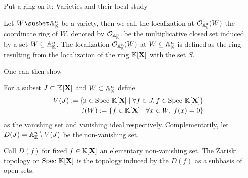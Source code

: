 \begin{subsection}{Put a ring on it: Varieties and their local study}
    \begin{definition}
        Let \( W \susbet \stdaff \) be a variety, then we call the localization at \( \mathcal{O}_{\mathbb{A}^{n}_{\mathbb{K}}}(W) \) the coordinate ring of \( W \), denoted by \( \mathcal{O}_{\mathbb{A}^{n}_{\mathbb{K}}} \).
        be the multiplicative closed set induced by a set \( W \subseteq \mathbb{A}^{n}_{\mathbb{K}} \).
        The localization \( \mathcal{O}_{\mathbb{A}^{n}_{\mathbb{K}}}(W) \) at \( W \subseteq \mathbb{A}^{n}_{\mathbb{K}} \) is defined as the ring resulting from the localization of the ring \( \mathbb{K}[\mathbf{X}] \) 
        with the set \( S \). 
    \end{definition}
    

    \begin{theorem}

    \end{theorem}
    One can then show 
    \begin{definition}
        For a subset \( J \subset \mathbb{K}[\mathbf{X}] \) and \( W \subset \mathbb{A}^{n}_{\mathbb{K}} \) define
        \begin{align*}
            V(J) := \left\{ \mathfrak{p} \in \text{Spec } \mathbb{K}[\mathbf{X}] \mid \forall f \in J, f \in \text{Spec } \mathbb{K}[\mathbf{X}] \right\}  \\
            I(W) := \left\{ f \in \mathbb{K}[\mathbf{X}] \mid \forall x \in W,\ f(x) = 0 \right\}
        \end{align*}
        as the vanishing set and vanishing ideal respectively. Complementarily, let
        \( D(J) = \mathbb{A}^{n}_{\mathbb{K}} \setminus V(J) \) be the non-vanishing set.
    \end{definition}
    \begin{definition}
        Call \( D(f) \) for fixed \( f \in \mathbb{K}[\mathbf{X}] \) an elementary non-vanishing set.
        The Zariski topology on \( \text{Spec } \mathbb{K}[\mathbf{X}] \) is the topology induced by the \( D(f) \)
        as a subbasis of open sets.
    \end{definition}

    \fi

\end{subsection}

